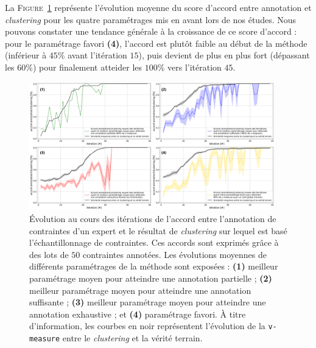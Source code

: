 			La \textsc{Figure~\ref{figure:4.5.1-ETUDE-RENTABILITE-ACCORD-ANNOTATION-CLUSTERING}} représente l'évolution moyenne du score d'accord entre annotation et \textit{clustering} pour les quatre paramétrages mis en avant lors de nos études.
			Nous pouvons constater une tendance générale à la croissance de ce score d'accord : pour le paramétrage favori \textbf{(4)}, l'accord est plutôt faible au début de la méthode (inférieur à $45$\% avant l'itération $15$), puis devient de plus en plus fort (dépassant les $60$\%) pour finalement atteider les $100$\% vers l'itération $45$.
			\begin{figure}[!htb]
				\centering
				\includegraphics[width=0.95\textwidth]{figures/etude-rentabilite-accord-annotation}
				\caption{
					Évolution au cours des itérations de l'accord entre l'annotation de contraintes d'un expert et le résultat de \textit{clustering} sur lequel est basé l'échantillonnage de contraintes.
					Ces accords sont exprimés grâce à des lots de $50$ contraintes annotées.
					Les évolutions moyennes de différents paramétrages de la méthode sont exposées :
					\textbf{(1)} meilleur paramétrage moyen pour atteindre une annotation partielle ;
					\textbf{(2)} meilleur paramétrage moyen pour atteindre une annotation suffisante ;
					\textbf{(3)} meilleur paramétrage moyen pour atteindre une annotation exhaustive ;
					et \textbf{(4)} paramétrage favori.
					À titre d'information, les courbes en noir représentent l'évolution de la \texttt{v-measure} entre le \textit{clustering} et la vérité terrain.
				} 
				\label{figure:4.5.1-ETUDE-RENTABILITE-ACCORD-ANNOTATION-CLUSTERING}
			\end{figure}
			
